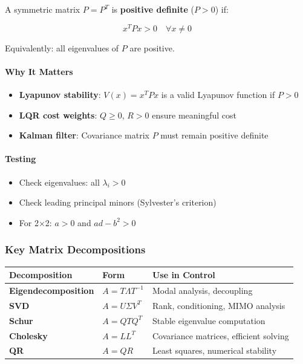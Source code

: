 \documentclass[11pt,a4paper]{book}
\begin{document}
A symmetric matrix $P = P^T$ is \textbf{positive definite} ($P > 0$) if:

\[x^T P x > 0 \quad \forall x \neq 0\]

Equivalently: all eigenvalues of $P$ are positive.

\paragraph{Why It Matters}

\begin{itemize}
\item \textbf{Lyapunov stability}: $V(x) = x^T P x$ is a valid Lyapunov function if $P > 0$
\item \textbf{LQR cost weights}: $Q \geq 0$, $R > 0$ ensure meaningful cost
\item \textbf{Kalman filter}: Covariance matrix $P$ must remain positive definite
\end{itemize}

\paragraph{Testing}

\begin{itemize}
\item Check eigenvalues: all $\lambda_i > 0$
\item Check leading principal minors (Sylvester's criterion)
\item For 2×2: $a > 0$ and $ad - b^2 > 0$
\end{itemize}

\medskip\noindent\hrulefill\medskip

\subsubsection{Key Matrix Decompositions}

\begin{center}
\begin{tabular}{|l|l|l|}
\hline
Decomposition & Form & Use in Control \\
\hline
\textbf{Eigendecomposition} & $A = T\Lambda T^{-1}$ & Modal analysis, decoupling \\
\textbf{SVD} & $A = U\Sigma V^T$ & Rank, conditioning, MIMO analysis \\
\textbf{Schur} & $A = QTQ^T$ & Stable eigenvalue computation \\
\textbf{Cholesky} & $A = LL^T$ & Covariance matrices, efficient solving \\
\textbf{QR} & $A = QR$ & Least squares, numerical stability \\
\hline
\end{tabular}
\end{center}
\end{document}
